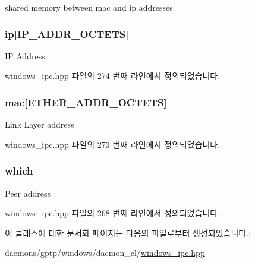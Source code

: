 shared memory between mac and ip addresses 

\subsubsection[{\texorpdfstring{ip}{ip}}]{ ip\mbox{[}{\bf I\+P\+\_\+\+A\+D\+D\+R\+\_\+\+O\+C\+T\+E\+TS}\mbox{]}}\hypertarget{class_peer_addr_a5d1f23243cffcfd3754c409068180066}{}\label{class_peer_addr_a5d1f23243cffcfd3754c409068180066}
IP Address 

windows\+\_\+ipc.\+hpp 파일의 274 번째 라인에서 정의되었습니다.

\subsubsection[{\texorpdfstring{mac}{mac}}]{ mac\mbox{[}{\bf E\+T\+H\+E\+R\+\_\+\+A\+D\+D\+R\+\_\+\+O\+C\+T\+E\+TS}\mbox{]}}\hypertarget{class_peer_addr_a73f4cb9857c5bab45dec0ad2108b5187}{}\label{class_peer_addr_a73f4cb9857c5bab45dec0ad2108b5187}
Link Layer address 

windows\+\_\+ipc.\+hpp 파일의 273 번째 라인에서 정의되었습니다.

\subsubsection[{\texorpdfstring{which}{which}}]{ which}\hypertarget{class_peer_addr_a4fac08886c91b71455b5cf143430499c}{}\label{class_peer_addr_a4fac08886c91b71455b5cf143430499c}
Peer address 

windows\+\_\+ipc.\+hpp 파일의 268 번째 라인에서 정의되었습니다.



이 클래스에 대한 문서화 페이지는 다음의 파일로부터 생성되었습니다.\+:\begin{DoxyCompactItemize}
\item 
daemons/gptp/windows/daemon\+\_\+cl/\hyperlink{windows__ipc_8hpp}{windows\+\_\+ipc.\+hpp}\end{DoxyCompactItemize}
